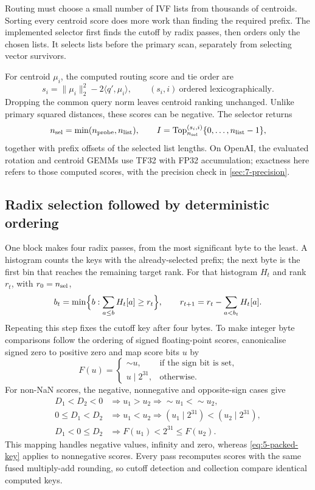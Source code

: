 Routing must choose a small number of IVF lists from thousands of
centroids. Sorting every centroid score does more work than finding the
required prefix. The implemented selector first finds the cutoff by
radix passes, then orders only the chosen lists. It selects lists before
the primary scan, separately from selecting vector survivors.

For centroid $\mu_i$, the computed routing score and tie order are
\begin{equation}
 s_i=\|\mu_i\|_2^2-2\langle q',\mu_i\rangle,
 \qquad (s_i,i)\ \text{ordered lexicographically}.
 \label{eq:5-probe-score}
\end{equation}
Dropping the common query norm leaves centroid ranking unchanged.
Unlike primary squared distances, these scores can be negative. The
selector returns
\[
 n_{\rm sel}=\min(n_{\rm probe},n_{\rm list}),\qquad
 I=\operatorname{Top}^{(s_i,i)}_{n_{\rm sel}}\{0,\ldots,n_{\rm list}-1\},
\]
together with prefix offsets of the selected list lengths. On OpenAI,
the evaluated rotation and centroid GEMMs use TF32 with FP32 accumulation;
exactness here refers to those computed scores, with the precision check
in \cref{sec:7-precision}.

\subsection{Radix selection followed by deterministic ordering}

One block makes four radix passes, from the most significant byte to
the least. A histogram counts the keys with the already-selected prefix;
the next byte is the first bin that reaches the remaining target rank.
For that histogram $H_t$ and rank $r_t$, with $r_0=n_{\rm sel}$,
\[
 b_t=\min\Bigl\{b:\sum_{a\leq b}H_t[a]\geq r_t\Bigr\},\qquad
 r_{t+1}=r_t-\sum_{a<b_t}H_t[a].
\]
Repeating this step fixes the cutoff key after four bytes. To make
integer byte comparisons follow the ordering of signed floating-point
scores, canonicalise signed zero to positive zero and map score bits $u$ by
\begin{equation}
 F(u)=\begin{cases}
       \mathop{\sim}u,&\text{if the sign bit is set},\\
       u\mathbin{|}2^{31},&\text{otherwise}.
      \end{cases}
 \label{eq:5-probe-key}
\end{equation}
For non-NaN scores, the negative, nonnegative and opposite-sign cases give
\[
 \begin{aligned}
 D_1<D_2<0&\Rightarrow u_1>u_2\Rightarrow{\sim}u_1<{\sim}u_2,\\
 0\leq D_1<D_2&\Rightarrow u_1<u_2\Rightarrow
 (u_1\mathbin{|}2^{31})<(u_2\mathbin{|}2^{31}),\\
 D_1<0\leq D_2&\Rightarrow F(u_1)<2^{31}\leq F(u_2).
 \end{aligned}
\]
This mapping handles negative values, infinity and zero, whereas
\cref{eq:5-packed-key} applies to nonnegative scores. Every pass recomputes
scores with the same fused multiply-add rounding, so cutoff detection
and collection compare identical computed keys.

